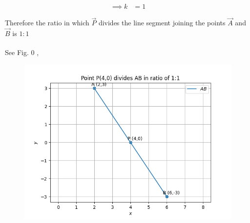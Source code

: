 \documentclass[journal]{IEEEtran}
\begin{document}
\begin{align}
\implies k &= 1
\end{align}

Therefore the ratio in which $\vec{P}$ divides the line segment joining the points $\vec{A}$ and $\vec{B}$ is $1:1$\\
\\
See Fig. 0 ,
\begin{figure}[H]
\begin{center}
\includegraphics[width=0.6\columnwidth]{figs/fig.png}
\end{center}
\caption{}
\label{fig:Fig1}
\end{figure}
\end{document}
